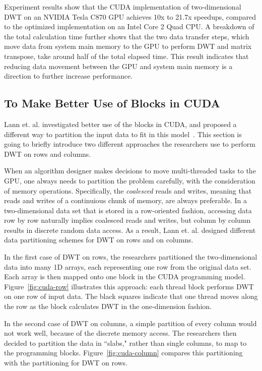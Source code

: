 Experiment results show that the CUDA implementation of 
two-dimensional DWT on an NVIDIA Tesla C870 GPU achieves 
10x to 21.7x speedups, compared to the optimized implementation 
on an Intel Core 2 Quad CPU.
%
A breakdown of the total calculation time further shows that 
the two data transfer steps, which move data from system main memory
to the GPU to perform DWT and matrix transpose, take around half
of the total elapsed time.
%
This result indicates that reducing data movement between the GPU and 
system main memory is a direction to further increase performance.  


\subsection{To Make Better Use of Blocks in CUDA}
%
Lann et. al. investigated better use of the blocks in CUDA,
and proposed a different way to partition the input data to fit in
this model~\cite{van2011accelerating}.
%
This section is going to briefly introduce two different approaches 
the researchers use to perform DWT on rows and columns.



When an algorithm designer makes decisions to move multi-threaded tasks
to the GPU, one always needs to partition the problem carefully,
with the consideration of memory operations.
%
Specifically, the \textit{coalesced} reads and writes,
meaning that reads and writes of a continuious chunk of memory,
are always preferable.
%
In a two-dimensional data set that is stored in a row-oriented fashion,
accessing data row by row naturally implies coalesced reads and writes,
but column by column results in discrete random data access.
%
As a result, Lann et. al. designed different data partitioning schemes 
for DWT on rows and on columns.


In the first case of DWT on rows, the researchers partitioned the 
two-dimensional data into many 1D arrays, each representing one row
from the original data set.
%
Each array is then mapped onto one block in the CUDA programming model.
%
Figure~\ref{fig:cuda-row} illustrates this approach: 
each thread block performs DWT on one row of input data.
%
The black squares indicate that one thread moves along the row
as the block calculates DWT in the one-dimension fashion.


In the second case of DWT on columns, a simple partition of every column
would not work well, because of the discrete memory access.
%
The researchers then decided to partition the data in ``slabs,"
rather than single columns, to map to the programming blocks.
%
Figure~\ref{fig:cuda-column} compares this partitioning with 
the partitioning for DWT on rows.


